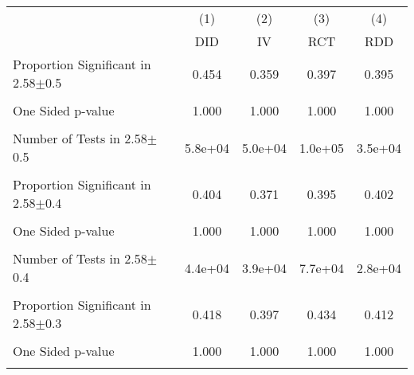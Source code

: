 {
\def\sym#1{\ifmmode^{#1}\else\(^{#1}\)\fi}
\begin{tabular}{l*{4}{c}}
\hline\hline
                &\multicolumn{1}{c}{(1)}&\multicolumn{1}{c}{(2)}&\multicolumn{1}{c}{(3)}&\multicolumn{1}{c}{(4)}\\
                &\multicolumn{1}{c}{DID}&\multicolumn{1}{c}{IV}&\multicolumn{1}{c}{RCT}&\multicolumn{1}{c}{RDD}\\
\hline
\hline Proportion Significant in 2.58$\pm$0.5&    0.454         &    0.359         &    0.397         &    0.395         \\
                &                  &                  &                  &                  \\
One Sided p-value&    1.000         &    1.000         &    1.000         &    1.000         \\
                &                  &                  &                  &                  \\
Number of Tests in 2.58$\pm$0.5&  5.8e+04         &  5.0e+04         &  1.0e+05         &  3.5e+04         \\
                &                  &                  &                  &                  \\
\hline Proportion Significant in 2.58$\pm$0.4&    0.404         &    0.371         &    0.395         &    0.402         \\
                &                  &                  &                  &                  \\
One Sided p-value&    1.000         &    1.000         &    1.000         &    1.000         \\
                &                  &                  &                  &                  \\
Number of Tests in 2.58$\pm$0.4&  4.4e+04         &  3.9e+04         &  7.7e+04         &  2.8e+04         \\
                &                  &                  &                  &                  \\
\hline Proportion Significant in 2.58$\pm$0.3&    0.418         &    0.397         &    0.434         &    0.412         \\
                &                  &                  &                  &                  \\
One Sided p-value&    1.000         &    1.000         &    1.000         &    1.000         \\
                &                  &                  &                  &                  \\

\end{tabular}}

